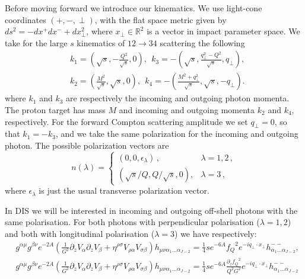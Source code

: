 \documentclass[a4paper,12pt]{article}
\begin{document}
Before moving forward we introduce our kinematics. We use light-cone coordinates $\left(+,-,\perp \right)$, with the flat space metric given by $ds^2 = - dx^+ dx^- + d x^2_\perp$, where $x_\perp \in \mathbb{R}^2$ is a vector in impact parameter space. 
We take for the large $s$ kinematics of  $12\to34$ scattering the following
\begin{align}
&k_1=\left(\!\sqrt{s},-\frac{Q^2}{\sqrt{s}} ,0\right),\  \ k_3=-\left(\!\sqrt{s},\frac{ q_\perp^2 -Q^2}{\sqrt{s}} , q_\perp \right)\!,\\
&k_2=\left(\frac{M^2}{\sqrt{s}},\sqrt{s} ,0\right),\  \ k_4=-\left(\frac{M^2+ q_\perp^2}{\sqrt{s}},\sqrt{s} ,-q_\perp \right).
\nonumber
\label{eq:kinematics}
\end{align}
where $k_1$ and $k_3$ are  respectively the incoming  and outgoing photon momenta. The proton 
target has mass $M$ and incoming  and outgoing  momenta $k_2$ and $k_4$, respectively.
For the forward Compton scattering amplitude we set $q_\perp = 0$, so that $k_1=-k_3$, and we take the same polarization
for the  incoming and outgoing photon. The possible polarization vectors are
\begin{equation}
  \label{eq:polarization vectors} 
  n(\lambda)=\begin{cases}
    (0,0,\epsilon_\lambda) \,, & \lambda=1,2 \,,\\
    \left( \sqrt{s}/Q, Q/\sqrt{s},0 \right) , & \lambda=3\,,
    \end{cases}
\end{equation}
where $\epsilon_\lambda$ is just the usual transverse polarization vector.

In DIS we will be interested in incoming and outgoing  off-shell photons with the same polarisation. For both photons with perpendicular polarisation ($\lambda = 1, 2$) and both with longitudinal polarisation ($\lambda = 3$) we have respectively:
\begin{align}
&g^{\alpha \mu} g^{\beta \nu} e^{-2 A} \left( \frac{1}{G^2} \partial_z V_\alpha \partial_z V_\beta + \eta^{\rho \sigma} V_{\rho \alpha} V_{\sigma \beta} \right) h_{\mu \nu \alpha_1 \dots \alpha_{J-2}} = \frac{1}{4} s e^{-6A} {f_Q}^2 e^{-i q_\perp \cdot x_\perp} h^{--}_{\alpha_1 \dots \alpha_{J-2}}, \\
&g^{\alpha \mu} g^{\beta \nu} e^{-2 A} \left( \frac{1}{G^2} \partial_z V_\alpha \partial_z V_\beta + \eta^{\rho \sigma} V_{\rho \alpha} V_{\sigma \beta} \right) h_{\mu \nu \alpha_1 \dots \alpha_{J-2}} = \frac{1}{4} s e^{-6A} \frac{{\partial_z f_Q}^2}{Q^2 G^2} e^{-i q_\perp \cdot x_\perp} h^{--}_{\alpha_1 \dots \alpha_{J-2}}
\end{align}
\end{document}
